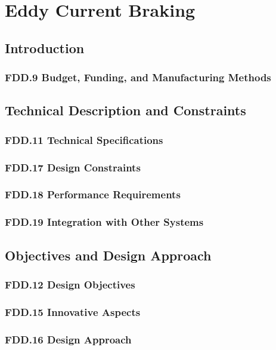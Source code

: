 \section{Eddy Current Braking}
\subsection{Introduction}
\subsubsection{FDD.9 Budget, Funding, and Manufacturing Methods}
 
\subsection{Technical Description and Constraints}
\subsubsection{FDD.11 Technical Specifications}
 
\subsubsection{FDD.17 Design Constraints}
 
\subsubsection{FDD.18 Performance Requirements}
 
\subsubsection{FDD.19 Integration with Other Systems}
 
\subsection{Objectives and Design Approach}
\subsubsection{FDD.12 Design Objectives}
 
\subsubsection{FDD.15 Innovative Aspects}
 
\subsubsection{FDD.16 Design Approach}
 
